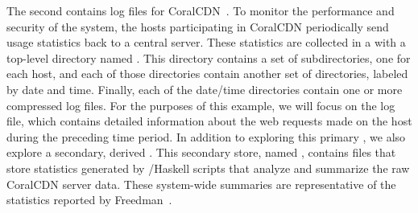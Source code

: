 The second \filestore{} contains log files for 
CoralCDN~\cite{freedman+:coral,freedman:coral-experience}. To
monitor the performance and security of the system, the hosts
participating in CoralCDN periodically send usage statistics back to
a central server. These statistics are collected in a \filestore{}
with a top-level directory named . 
This directory contains a set of subdirectories, 
one for each host, and each of those directories contain
another set of directories, labeled by date and time.
Finally, each of the
date/time directories contain one or more compressed log files. For the
purposes of this example, we will focus on the 
log file, which contains detailed information about the web requests
made on the host during the preceding time period.  
In addition to exploring this primary \filestore{},
we also explore a secondary, derived \filestore{}. 
This secondary store, named
, contains files  
that store statistics
generated by \forest{}/Haskell scripts that analyze and
summarize the raw CoralCDN server data.  These system-wide summaries are
representative of the statistics reported by
Freedman~\cite{freedman:coral-experience}.



